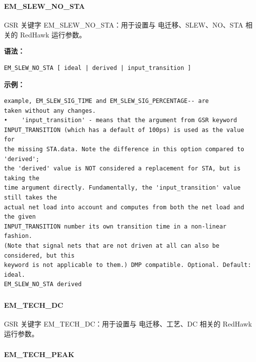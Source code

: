 \subsubsection{}
\paragraph*{EM_SLEW_NO_STA}

GSR 关键字 EM_SLEW_NO_STA：用于设置与 电迁移、SLEW、NO、STA 相关的 RedHawk 运行参数。

\textbf{语法：}
\begin{lstlisting}
EM_SLEW_NO_STA [ ideal | derived | input_transition ]
\end{lstlisting}

\textbf{示例：}
\begin{lstlisting}
example, EM_SLEW_SIG_TIME and EM_SLEW_SIG_PERCENTAGE-- are
taken without any changes.
•    'input_transition' - means that the argument from GSR keyword
INPUT_TRANSITION (which has a default of 100ps) is used as the value for
the missing STA.data. Note the difference in this option compared to 'derived';
the 'derived' value is NOT considered a replacement for STA, but is taking the
time argument directly. Fundamentally, the 'input_transition' value still takes the
actual net load into account and computes from both the net load and the given
INPUT_TRANSITION number its own transition time in a non-linear fashion.
(Note that signal nets that are not driven at all can also be considered, but this
keyword is not applicable to them.) DMP compatible. Optional. Default: ideal.
EM_SLEW_NO_STA derived
\end{lstlisting}

\subsubsection{}
\paragraph*{EM_TECH_DC}

GSR 关键字 EM_TECH_DC：用于设置与 电迁移、工艺、DC 相关的 RedHawk 运行参数。

\subsubsection{}
\paragraph*{EM_TECH_PEAK}


